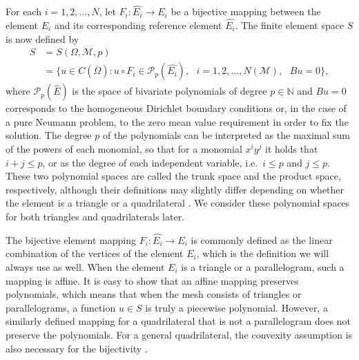 \documentclass[english, 12pt, a4paper, sci, utf8, a-2b, online]{aaltothesis}
\theoremstyle{definition}
\theoremstyle{plain}
\numberwithin{equation}{section}
\begin{document}
For each $i=1,2,\dotsc,N$, let $F_i: \widehat{E_i} \to E_i$ be a bijective mapping
between the element $E_i$ and its corresponding reference element $\widehat{E_i}$.
The finite element space $S$ is now defined by
\begin{align}
    S
    &= S(\Omega, \mathcal{M}, p) \nonumber \\
    \label{eq:fem_space}
    &= \{
        u \in C(\overline{\Omega})
            : u \circ F_i \in \mathcal{P}_p(\widehat{E_i}),
                \text{ } i=1,2,\dotsc,N(\mathcal{M}),
                    \text{ } Bu = 0
    \},
\end{align}
where $\mathcal{P}_p(\widehat{E})$ is the space of bivariate polynomials of degree
$p \in \mathbb{N}$ and $Bu = 0$ corresponds to the homogeneous Dirichlet boundary
conditions or, in the case of a pure Neumann problem, to the zero mean value requirement
in order to fix the solution.
The degree $p$ of the polynomials can be interpreted as
the maximal sum of the powers of each monomial,
so that for a monomial $x^i y^j$ it holds that $i+j \leq p$,
or as the degree of each independent variable, i.e.\ $i \leq p$ and $j \leq p$.
These two polynomial spaces are called the trunk space and the product space, respectively,
although their definitions may slightly differ depending on whether the element is
a triangle or a quadrilateral \cite{szabobabuska2011}.
We consider these polynomial spaces for both triangles and quadrilaterals later.

The bijective element mapping $F_i: \widehat{E_i} \to E_i$ is commonly defined
as the linear combination of the vertices of the element $E_i$,
which is the definition we will always use as well.
When the element $E_i$ is a triangle or a parallelogram, such a mapping is affine.
It is easy to show that an affine mapping preserves polynomials, which means that
when the mesh consists of triangles or parallelograms, a function $u \in S$
is truly a piecewise polynomial. However, a similarly defined mapping for
a quadrilateral that is not a parallelogram does not preserve the polynomials.
For a general quadrilateral, the convexity assumption is also necessary for the bijectivity
\cite{strang1973}.
\end{document}
